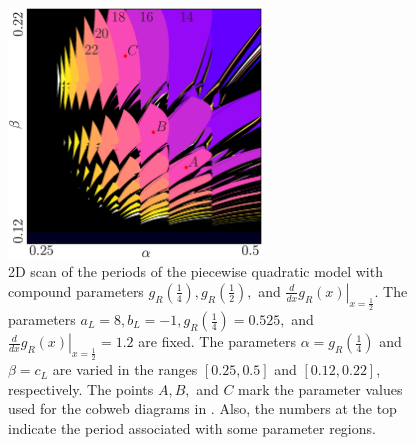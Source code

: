 \begin{figure}
	\centering
	\includegraphics[width=0.6\textwidth]{../Figures/5/5.9/result.png}
	\caption[2D scan of the periods of the quadratic model with compound parameters]{
	2D scan of the periods of the piecewise quadratic model with compound parameters $g_R\left(\frac{1}{4}\right), g_R\left(\frac{1}{2}\right),$ and $\left. \frac{d}{dx} g_R\left(x\right) \right|_{x = \frac{1}{2}}$.
	The parameters $a_L = 8, b_L = -1, g_R\left(\frac{1}{4}\right) = 0.525,$ and $\left. \frac{d}{dx} g_R\left(x\right) \right|_{x = \frac{1}{2}} = 1.2$ are fixed.
	The parameters $\alpha = g_R\left(\frac{1}{4}\right)$ and $\beta = c_L$ are varied in the ranges $[0.25, 0.5]$ and $[0.12, 0.22]$, respectively.
	The points $A, B,$ and $C$ mark the parameter values used for the cobweb diagrams in .
	Also, the numbers at the top indicate the period associated with some parameter regions.
	}
	\label{fig:setup.quad.hyper.1.period}
\end{figure}

